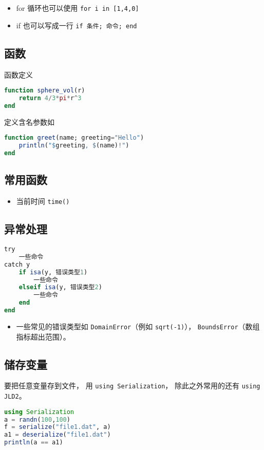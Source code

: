 \begin{itemize}
\item for 循环也可以使用 \verb`for i in [1,4,0]`
\item if 也可以写成一行 \verb`if 条件; 命令; end`
\end{itemize}

\subsection{函数}
函数定义
\begin{lstlisting}[language=julia]
function sphere_vol(r)
    return 4/3*pi*r^3
end
\end{lstlisting}

定义含名参数如
\begin{lstlisting}[language=julia]
function greet(name; greeting="Hello")
    println("$greeting, $(name)!")
end
\end{lstlisting}

\subsection{常用函数}
\begin{itemize}
\item 当前时间 \verb`time()`
\end{itemize}

\subsection{异常处理}
\begin{lstlisting}[language=julia]
try 
    一些命令
catch y
    if isa(y, 错误类型1)
        一些命令
    elseif isa(y, 错误类型2)
        一些命令
    end
end
\end{lstlisting}
\begin{itemize}
\item 一些常见的错误类型如 \verb`DomainError`（例如 \verb`sqrt(-1)`）， \verb`BoundsError`（数组指标超出范围）。
\end{itemize}


\subsection{储存变量}
要把任意变量存到文件， 用 \verb`using Serialization`， 除此之外常用的还有 \verb`using JLD2`。
\begin{lstlisting}[language=julia]
using Serialization
a = randn(100,100)
f = serialize("file1.dat", a)
a1 = deserialize("file1.dat")
println(a == a1)
\end{lstlisting}

